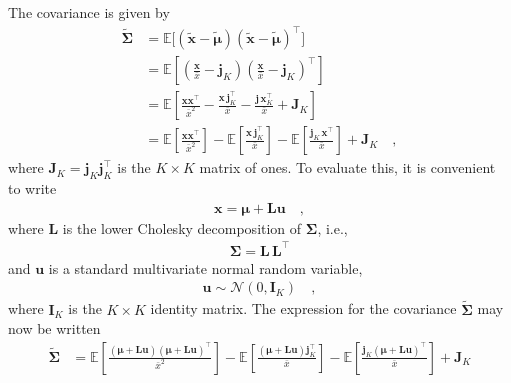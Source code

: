\documentclass[modern]{aastex62}
\begin{document}
The covariance is given by
%
\begin{align}
    \tilde{\pmb{\Sigma}}
     & =
    \mathbb{E}\big[ (\tilde{\mathbf{x}} - \tilde{\pmb{\mu}}) (\tilde{\mathbf{x}} - \tilde{\pmb{\mu}} )^\top \big]
    \nonumber \\[0.5em]
     & =
    \mathbb{E}\left[
        \left(\frac{\mathbf{x}}{\bar{x}} - \mathbf{j}_K\right)
        \left(\frac{\mathbf{x}}{\bar{x}} - \mathbf{j}_K\right)^\top
        \right]
    \nonumber \\[0.5em]
     & =
    \mathbb{E}\left[
        \frac{\mathbf{x}\mathbf{x}^\top}{\bar{x}^2}
        -
        \frac{\mathbf{x}\,\mathbf{j}_K^\top}{\bar{x}}
        -
        \frac{\mathbf{j}\,\mathbf{x}_K^\top}{\bar{x}}
        +
        \mathbf{J}_K
        \right]
    \nonumber \\[0.5em]
     & =
    \mathbb{E}\left[
        \frac{\mathbf{x}\mathbf{x}^\top}{\bar{x}^2}
        \right]
    -
    \mathbb{E}\left[
        \frac{\mathbf{x}\,\mathbf{j}_K^\top}{\bar{x}}
        \right]
    -
    \mathbb{E}\left[
        \frac{\mathbf{j}_K\,\mathbf{x}^\top}{\bar{x}}
        \right]
    +
    \mathbf{J}_K
    \quad,
\end{align}
%
where $\mathbf{J}_K = \mathbf{j}_K \mathbf{j}_K^\top$ is the $K\times K$ matrix of ones.
To evaluate this, it is convenient to write
%
\begin{align}
    \mathbf{x} = \pmb{\mu} + \mathbf{L} \mathbf{u}
    \quad,
\end{align}
%
where $\mathbf{L}$ is the lower Cholesky decomposition of $\pmb{\Sigma}$,
i.e.,
%
\begin{align}
    \pmb{\Sigma} = \mathbf{L}\,\mathbf{L}^\top
\end{align}
%
and $\mathbf{u}$ is a standard multivariate normal random variable,
%
\begin{align}
    \mathbf{u} \sim \mathcal{N}\left( 0, \mathbf{I}_K \right)
    \quad,
\end{align}
%
where $\mathbf{I}_K$ is the
$K \times K$ identity matrix.
The expression for the covariance $\tilde{\pmb{\Sigma}}$ may now be written
%
\begin{align}
    \tilde{\pmb{\Sigma}}
     & =
    \mathbb{E}\left[
        \frac{
            (\pmb{\mu} + \mathbf{L} \mathbf{u})(\pmb{\mu} + \mathbf{L} \mathbf{u})^\top
        }{
            \bar{x}^2
        }
        \right]
    -
    \mathbb{E}\left[
        \frac{
            (\pmb{\mu} + \mathbf{L} \mathbf{u})\mathbf{j}_K^\top
        }{
            \bar{x}
        }
        \right]
    -
    \mathbb{E}\left[
        \frac{
            \mathbf{j}_K(\pmb{\mu} + \mathbf{L} \mathbf{u})^\top
        }{
            \bar{x}
        }
        \right]
    +
    \mathbf{J}_K
\end{align}
\end{document}
